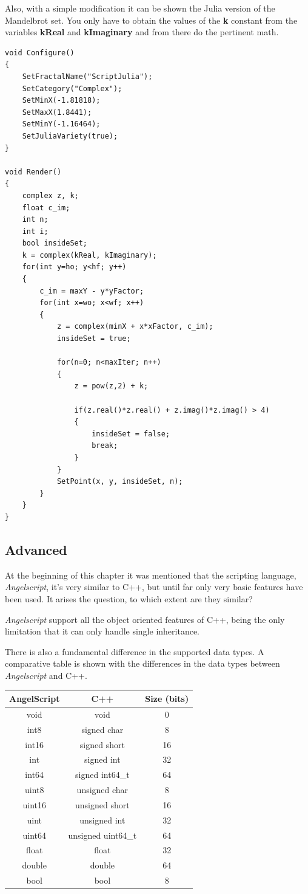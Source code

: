 \documentclass[oneside]{book}
\begin{document}
Also, with a simple modification it can be shown the Julia version of the Mandelbrot set. You only have to obtain the values of the \textbf{k} constant from the variables \textbf{kReal} and \textbf{kImaginary} and from there do the pertinent math.

\begin{lstlisting}
void Configure()
{
	SetFractalName("ScriptJulia");
	SetCategory("Complex");
	SetMinX(-1.81818);
	SetMaxX(1.8441);
	SetMinY(-1.16464);
	SetJuliaVariety(true);
}

void Render()
{
	complex z, k;
	float c_im;
	int n;
	int i;
	bool insideSet;
	k = complex(kReal, kImaginary);
	for(int y=ho; y<hf; y++)
	{
		c_im = maxY - y*yFactor;
		for(int x=wo; x<wf; x++)
		{
			z = complex(minX + x*xFactor, c_im);
			insideSet = true;

			for(n=0; n<maxIter; n++)
			{
				z = pow(z,2) + k;
				
				if(z.real()*z.real() + z.imag()*z.imag() > 4)
				{
					insideSet = false;
					break;
				}
			}
			SetPoint(x, y, insideSet, n);
		}
	}
}
\end{lstlisting}

\subsection{Advanced}
At the beginning of this chapter it was mentioned that the scripting language, \textit{Angelscript}, it's very similar to C++, but until far only very basic features have been used. It arises the question, to which extent are they similar?

\textit{Angelscript} support all the object oriented features of C++, being the only limitation that it can only handle single inheritance.

There is also a fundamental difference in the supported data types. A comparative table is shown with the differences in the data types between \textit{Angelscript} and C++.

\begin{center}
\begin{tabular}{|c|c|c|}
\hline 
\textbf{AngelScript} & \textbf{C++} & \textbf{Size (bits)} \\ 
\hline 
void & void & 0 \\ 
\hline 
int8 & signed char & 8 \\ 
\hline 
int16 & signed short & 16 \\ 
\hline 
int & signed int & 32 \\ 
\hline 
int64 & signed int64\_t & 64 \\ 
\hline 
uint8 & unsigned char & 8 \\ 
\hline 
uint16 & unsigned short & 16 \\ 
\hline 
uint & unsigned int & 32 \\ 
\hline 
uint64 & unsigned uint64\_t & 64 \\ 
\hline 
float & float & 32 \\ 
\hline 
double & double & 64 \\ 
\hline 
bool & bool & 8 \\ 
\hline 
\end{tabular} 
\end{center}
\end{document}
